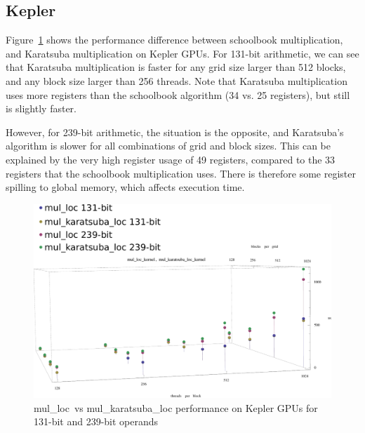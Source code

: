\documentclass[12pt, a4paper]{report}
\begin{document}
\begin{sloppypar}
\subsection{Kepler}
Figure~\ref{fig:mul_loc_vs_mul_karatsuba_loc_kepler_131_vs_239_duration} shows the
performance difference between schoolbook multiplication, and Karatsuba multiplication on Kepler GPUs.
For 131-bit arithmetic, we can see that Karatsuba multiplication is faster for
any grid size larger than 512 blocks, and any block size larger than 256 threads.
Note that Karatsuba multiplication uses more registers than the schoolbook algorithm (34 vs. 25 registers), but still is slightly faster.

However, for 239-bit arithmetic, the situation is the opposite, and Karatsuba's algorithm
is slower for all combinations of grid and block sizes. This can be explained by the
very high register usage of 49 registers, compared to the 33 registers that the schoolbook
multiplication uses.
There is therefore some register spilling to global memory, which affects execution time.

\begin{figure}[h]
\centering
\includegraphics[scale=0.5]{figs/mul_loc_vs_mul_karatsuba_loc_kepler_131_vs_239_duration}
\caption{mul\_loc\ vs mul\_karatsuba\_loc performance on Kepler GPUs for 131-bit and 239-bit operands}
\label{fig:mul_loc_vs_mul_karatsuba_loc_kepler_131_vs_239_duration}
\end{figure}


\end{sloppypar}
\end{document}
